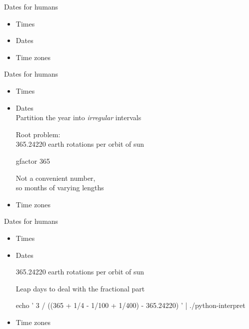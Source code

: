 \documentclass[xcolor=svgnames,17pt]{beamer}
\newcommand*{\sizefont}[1]{%
    \ifcase#1\relax
    \or \tiny
    \or \scriptsize
    \or \footnotesize
    \or \small
    \or \normalsize
    \or \large
    \or \Large
    \or \LARGE
    \or \huge
    \or \Huge
    \fi}
\begin{document}
\begin{frame}[fragile]{Dates for humans}
\begin{itemize}
\item Times
\item \alert{Dates}




\item Time zones
\end{itemize}
\end{frame}

\begin{frame}[fragile]{Dates for humans}
\begin{itemize}
\item Times
\item \alert{Dates} \\
    Partition the year into \textit{irregular} intervals

    Root problem: \\
    365.24220 earth rotations per orbit of sun

\bash[stdout,script,prefix=$\space]
gfactor 365
\END

Not a convenient number, \\
so months of varying lengths

\item Time zones
\end{itemize}
\end{frame}

\begin{frame}[fragile]{Dates for humans}
\begin{itemize}
\item Times
\item \alert{Dates}

    365.24220 earth rotations per orbit of sun

    Leap days to deal with the fractional part

{
\sizefont{2}
\bash[stdout]
echo '
3 / ((365 + 1/4 - 1/100 + 1/400) - 365.24220)
' | ./python-interpret
\END
}

\item Time zones
\end{itemize}
\end{frame}
\end{document}
